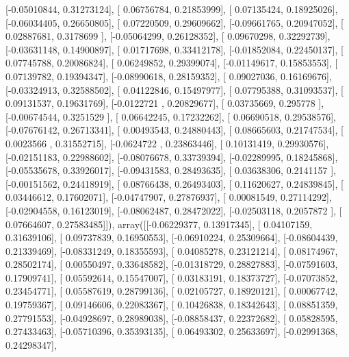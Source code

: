 \documentclass{article}
\begin{document}
       [-0.05010844,  0.31273124],
       [ 0.06756784,  0.21853999],
       [ 0.07135424,  0.18925026],
       [-0.06034405,  0.26650805],
       [ 0.07220509,  0.29609662],
       [-0.09661765,  0.20947052],
       [ 0.02887681,  0.3178699 ],
       [-0.05064299,  0.26128352],
       [ 0.09670298,  0.32292739],
       [-0.03631148,  0.14900897],
       [ 0.01717698,  0.33412178],
       [-0.01852084,  0.22450137],
       [ 0.07745788,  0.20086824],
       [ 0.06249852,  0.29399074],
       [-0.01149617,  0.15853553],
       [ 0.07139782,  0.19394347],
       [-0.08990618,  0.28159352],
       [ 0.09027036,  0.16169676],
       [-0.03324913,  0.32588502],
       [ 0.04122846,  0.15497977],
       [ 0.07795388,  0.31093537],
       [ 0.09131537,  0.19631769],
       [-0.0122721 ,  0.20829677],
       [ 0.03735669,  0.295778  ],
       [-0.00674544,  0.3251529 ],
       [ 0.06642245,  0.17232262],
       [ 0.06690518,  0.29538576],
       [-0.07676142,  0.26713341],
       [ 0.00493543,  0.24880443],
       [ 0.08665603,  0.21747534],
       [ 0.0023566 ,  0.31552715],
       [-0.0624722 ,  0.23863446],
       [ 0.10131419,  0.29930576],
       [-0.02151183,  0.22988602],
       [-0.08076678,  0.33739394],
       [-0.02289995,  0.18245868],
       [-0.05535678,  0.33926017],
       [-0.09431583,  0.28493635],
       [ 0.03638306,  0.2141157 ],
       [-0.00151562,  0.24418919],
       [ 0.08766438,  0.26493403],
       [ 0.11620627,  0.24839845],
       [ 0.03446612,  0.17602071],
       [-0.04747907,  0.27876937],
       [ 0.00081549,  0.27114292],
       [-0.02904558,  0.16123019],
       [-0.08062487,  0.28472022],
       [-0.02503118,  0.2057872 ],
       [ 0.07664607,  0.27583485]]), array([[-0.06229377,  0.13917345],
       [ 0.04107159,  0.31639106],
       [ 0.09737839,  0.16950553],
       [-0.06910224,  0.25309664],
       [-0.08604439,  0.21339469],
       [-0.08331249,  0.18355593],
       [ 0.04085278,  0.23121214],
       [ 0.08174967,  0.28502174],
       [ 0.00550497,  0.33648582],
       [-0.01318729,  0.28827883],
       [-0.07591603,  0.17909741],
       [ 0.05592614,  0.15547007],
       [ 0.03183191,  0.18373727],
       [-0.07073852,  0.23454771],
       [ 0.05587619,  0.28799136],
       [ 0.02105727,  0.18920121],
       [ 0.00067742,  0.19759367],
       [ 0.09146606,  0.22083367],
       [ 0.10426838,  0.18342643],
       [ 0.08851359,  0.27791553],
       [-0.04928697,  0.28989038],
       [-0.08858437,  0.22372682],
       [ 0.05828595,  0.27433463],
       [-0.05710396,  0.35393135],
       [ 0.06493302,  0.25633697],
       [-0.02991368,  0.24298347],
\end{document}
